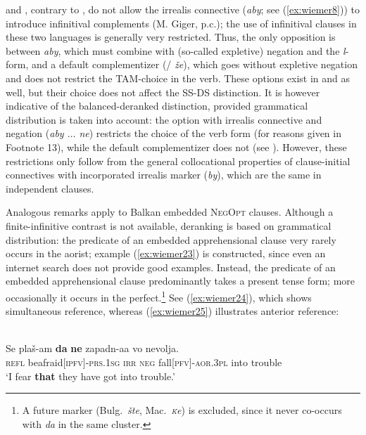 \documentclass[output=paper,colorlinks,citecolor=brown]{langscibook}
\begin{document}
  and , contrary to , do not allow the irrealis connective (\textit{aby}; see (\ref{ex:wiemer8})) to introduce infinitival complements (M. Giger, p.c.); the use of infinitival clauses in these two languages is generally very restricted. Thus, the only opposition is between \textit{aby}, which must combine with (so-called expletive) negation and the \textit{l}-form, and a default complementizer (/ \textit{že}), which goes without expletive negation and does not restrict the TAM-choice in the verb. These options exist in  and  as well, but their choice does not affect the SS-DS distinction. It is however indicative of the balanced-deranked distinction, provided grammatical distribution is taken into account: the option with irrealis connective and negation (\textit{aby $\ldots$ ne}) restricts the choice of the verb form (for reasons given in Footnote 13), while the default complementizer does not (see ). However, these restrictions only follow from the general collocational properties of clause-initial connectives with incorporated irrealis marker (\textit{by}), which are the same in independent clauses.


Analogous remarks apply to Balkan  embedded \textsc{NegOpt} clauses. Al\-though a finite-infinitive contrast is not available, deranking is based on grammatical distribution: the predicate of an embedded apprehensional clause very rarely occurs in the aorist; example (\ref{ex:wiemer23}) is constructed, since even an internet search does not provide good examples. Instead, the predicate of an embedded apprehensional clause predominantly takes a present tense form; more occasionally it occurs in the perfect.\footnote{A future marker (Bulg.\ \textit{šte}, Mac.\ \textit{\textsc{\'k}e}) is excluded, since it never co-occurs with \textit{da} in the same cluster.} See (\ref{ex:wiemer24}), which shows simultaneous reference, whereas (\ref{ex:wiemer25}) illustrates anterior reference:


\ea
\label{ex:wiemer23} 
 \\
\gll Se plaš-am \textbf{da} \textbf{ne} zapadn-aa vo nevolja. \\
\textsc{refl} be\textunderscore afraid\textsc{[ipfv]-prs.1sg} \textsc{irr} \textsc{neg} fall\textsc{[pfv]-aor.3pl} into trouble \\
\glt `I fear \textbf{that} they have got into trouble.' \\
\z
\end{document}
